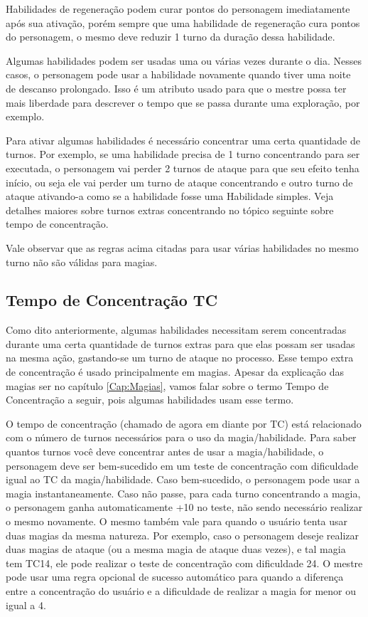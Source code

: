 Habilidades de regeneração podem curar pontos do personagem imediatamente após sua ativação, porém sempre que uma habilidade de regeneração cura pontos do personagem, o mesmo deve reduzir 1 turno da duração dessa habilidade.

Algumas habilidades podem ser usadas uma ou várias vezes durante o dia. Nesses casos, o personagem pode usar a habilidade novamente quando tiver uma noite de descanso prolongado. Isso é um atributo usado para que o mestre possa ter mais liberdade para descrever o tempo que se passa durante uma exploração, por exemplo.

Para ativar algumas habilidades é necessário concentrar uma certa quantidade de turnos. Por exemplo, se uma habilidade precisa de 1 turno concentrando para ser executada, o personagem vai perder 2 turnos de ataque para que seu efeito tenha início, ou seja ele vai perder um turno de ataque concentrando e outro turno de ataque ativando-a como se a habilidade fosse uma Habilidade simples. Veja detalhes maiores sobre turnos extras concentrando no tópico seguinte sobre tempo de concentração.


Vale observar que as regras acima citadas para usar várias habilidades no mesmo turno não são válidas para magias.

\subsection{Tempo de Concentração TC}

Como dito anteriormente, algumas habilidades necessitam serem concentradas durante uma certa quantidade de turnos extras para que elas possam ser usadas na mesma ação, gastando-se um turno de ataque no processo. Esse tempo extra de concentração é usado principalmente em magias. Apesar da explicação das magias ser no capítulo \ref{Cap:Magias}, vamos falar sobre o termo Tempo de Concentração a seguir, pois algumas habilidades usam esse termo.

O tempo de concentração (chamado de agora em diante por TC) está relacionado com o número de turnos necessários para o uso da magia/habilidade. Para saber quantos turnos você deve concentrar antes de usar a magia/habilidade, o personagem deve ser bem-sucedido em um teste de concentração com dificuldade igual ao TC da magia/habilidade. Caso bem-sucedido, o personagem pode usar a magia instantaneamente. Caso não passe, para cada turno concentrando a magia, o personagem ganha automaticamente +10 no teste, não sendo necessário realizar o mesmo novamente. O mesmo também vale para quando o usuário tenta usar duas magias da mesma natureza. Por exemplo, caso o personagem deseje realizar duas magias de ataque (ou a mesma magia de ataque duas vezes), e tal magia tem TC14, ele pode realizar o teste de concentração com dificuldade 24. O mestre pode usar uma regra opcional de sucesso automático para quando a diferença entre a concentração do usuário e a dificuldade de realizar a magia for menor ou igual a 4.

